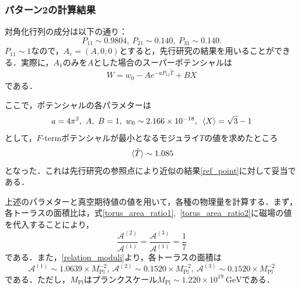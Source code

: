 \documentclass[a4paper,uplatex,dvipdfmx]{jsarticle}
\theoremstyle{definition}
\begin{document}
\subsubsection*{パターン2の計算結果}

対角化行列の成分は以下の通り：
\begin{equation}
   P_{11}\sim 0.9804
   ,\ 
   P_{21}\sim 0.140
   ,\ 
   P_{31}\sim 0.140
   .
   \nonumber
\end{equation}
$P_{11}\sim 1$なので，$A_{r}=(A,0,0)$とすると，先行研究の結果を用いることができる．実際に，$A_{1}$のみを$A$とした場合のスーパーポテンシャルは
\begin{equation}
   W
   =
   w_{0}
   -
   Ae^{- aP_{11}\tilde{T}}
   +
   BX
   \nonumber
\end{equation}
である．

ここで，ポテンシャルの各パラメターは
\begin{equation}
   a
   =
   4 \pi^2
   ,\ 
   A,\ B
   =
   1
   ,\ 
   w_{0}
   \sim
   2.166
   \times
   10^{-18}
   ,\ 
   \ev*{X}
   =
   \sqrt{3}-1
   \nonumber
\end{equation}
として，$F$-termポテンシャルが最小となるモジュライ$T$の値を求めたところ
\begin{equation}
   \ev*{\tilde{T}}
   \sim
   1.085
   \label{moduli_parameter}
\end{equation}
となった．これは先行研究の参照点により近似の結果\eqref{ref_point}に対して妥当である．

上述のパラメターと真空期待値の値を用いて，各種の物理量を計算する．まず，各トーラスの面積比は，式\eqref{torus_area_ratio1},\ \eqref{torus_area_ratio2}に磁場の値を代入することにより，
\begin{equation}
   \frac{\mathcal{A}^{(2)}}{\mathcal{A}^{(1)}}
   =
   \frac{\mathcal{A}^{(3)}}{\mathcal{A}^{(1)}}
   =
   \frac{1}{7}
   \nonumber
\end{equation}
である．また，\eqref{relation_moduli}より，各トーラスの面積は
\begin{equation}
   \mathcal{A}^{(1)}
   \sim
   1.0639
   \times
   M_{\text{Pl}}^{-2}
   ,\ 
   \mathcal{A}^{(2)}
   \sim
   0.1520
   \times
   M_{\text{Pl}}^{-2}
   ,\ 
   \mathcal{A}^{(3)}
   \sim   
   0.1520
   \times
   M_{\text{Pl}}^{-2}
   \nonumber
\end{equation}
である．ただし，$M_{\text{Pl}}$はプランクスケール$M_{\text{Pl}}\sim 1.220\times 10^{19}\ \text{GeV}$である．
\end{document}
